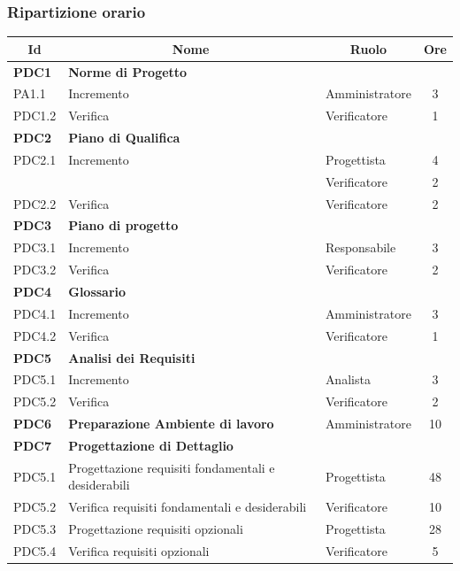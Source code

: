 \subsubsection{Ripartizione orario}
\begin{table}[H]
	\centering
	\begin{tabular*}{1\textwidth}{ @{\extracolsep{\fill} } l l l c  }
	\hline
	\multicolumn{1}{c}{\textbf{Id}} & 
	\multicolumn{1}{c}{\textbf{Nome}} & 
	\multicolumn{1}{c}{\textbf{Ruolo}}& 
	\multicolumn{1}{c}{\textbf{Ore}} \\
	\hline
	
	\textbf{PDC1} & \textbf{Norme di Progetto} \\
	\cline{3-4}
	PA1.1 & Incremento & Amministratore & 3\\ 
        \cline{3-4}
	PDC1.2 & Verifica & Verificatore & 1\\
	
	\hline
	\textbf{PDC2} & \textbf{Piano di Qualifica} \\
	\cline{3-4}
	PDC2.1 & Incremento & Progettista & 4\\
        & & Verificatore & 2\\
        \cline{3-4}
	PDC2.2 & Verifica & Verificatore & 2\\
	
	\hline
	\textbf{PDC3}  & \textbf{Piano di progetto} \\
	\cline{3-4}
	PDC3.1 & Incremento & Responsabile & 3\\ 
        \cline{3-4}
	PDC3.2 & Verifica & Verificatore & 2\\

	\hline
	\textbf{PDC4} & \textbf{Glossario} \\
	\cline{3-4}
	PDC4.1 & Incremento & Amministratore & 3\\ 
        \cline{3-4}
	PDC4.2 & Verifica & Verificatore & 1\\

        \hline
        \textbf{PDC5} & \textbf{Analisi dei Requisiti}\\
        \cline{3-4}
        PDC5.1 & Incremento & Analista & 3\\
        \cline{3-4}
        PDC5.2 & Verifica & Verificatore & 2\\

        \hline
        \textbf{PDC6} & \textbf{Preparazione Ambiente di lavoro} & Amministratore & 10\\

        \hline
        \textbf{PDC7} & \textbf{Progettazione di Dettaglio} \\
	\cline{3-4}
	PDC5.1 & Progettazione requisiti fondamentali e desiderabili & Progettista & 48\\ 
        \cline{3-4}
	PDC5.2 & Verifica requisiti fondamentali e desiderabili & Verificatore & 10\\
        \cline{3-4}
	PDC5.3 & Progettazione requisiti opzionali & Progettista & 28\\
        \cline{3-4}
	PDC5.4 & Verifica requisiti opzionali & Verificatore & 5\\


\end{tabular*}
\end{table}
